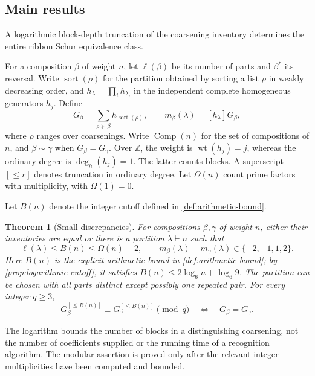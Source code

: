 \documentclass[11pt,a4paper]{amsart}
\numberwithin{equation}{section}
\theoremstyle{plain}
\newtheorem{theorem}{Theorem}[section]
\theoremstyle{definition}
\newcommand{\Z}{\mathbb Z}
\newcommand{\Comp}{\operatorname{Comp}}
\newcommand{\wt}{\operatorname{wt}}
\newcommand{\sort}{\operatorname{sort}}
\begin{document}
\subsection{Main results}

A logarithmic block-depth truncation of the coarsening inventory determines
the entire ribbon Schur equivalence class.

For a composition \(\beta\) of weight \(n\), let \(\ell(\beta)\) be
its number of parts and \(\beta^*\) its reversal.  Write \(\sort(\rho)\)
for the partition obtained by sorting a list \(\rho\) in weakly decreasing
order, and \(h_\lambda=\prod_i h_{\lambda_i}\) in the independent complete
homogeneous generators \(h_j\).  Define
\begin{equation}\label{eq:introG}
G_\beta=\sum_{\rho\succeq\beta}h_{\sort(\rho)},
\qquad m_\beta(\lambda)=[h_\lambda]G_\beta,
\end{equation}
where \(\rho\) ranges over coarsenings.  Write \(\Comp(n)\) for the set of
compositions of \(n\), and \(\beta\sim\gamma\) when \(G_\beta=G_\gamma\).
Over \(\Z\), the weight is \(\wt(h_j)=j\), whereas the ordinary degree is
\(\deg_h(h_j)=1\).
The latter counts blocks.  A superscript \([\le r]\) denotes truncation in
ordinary degree.  Let \(\Omega(n)\) count prime factors with multiplicity,
with \(\Omega(1)=0\).

Let \(B(n)\) denote the integer cutoff defined in
\cref{def:arithmetic-bound}.

\begin{theorem}[Small discrepancies]\label{thm:main-recognition}
For compositions \(\beta,\gamma\) of weight \(n\), either their inventories
are equal or there is a partition \(\lambda\vdash n\) such that
\[
\ell(\lambda)\le B(n)\le\Omega(n)+2,
\qquad m_\beta(\lambda)-m_\gamma(\lambda)\in\{-2,-1,1,2\}.
\]
Here \(B(n)\) is the explicit arithmetic bound in
\cref{def:arithmetic-bound}; by \cref{prop:logarithmic-cutoff}, it satisfies
\(B(n)\le2\log_6n+\log_6 9\).  The partition can be chosen with all parts
distinct except possibly one repeated pair.  For every integer \(q\ge3\),
\begin{equation}\label{eq:main-modular}
G_\beta^{[\le B(n)]}\equiv
G_\gamma^{[\le B(n)]}\pmod q
\quad\Longleftrightarrow\quad G_\beta=G_\gamma.
\end{equation}
\end{theorem}

The logarithm bounds the number of blocks in a distinguishing coarsening,
not the number of coefficients supplied or the running time of a recognition
algorithm.  The modular assertion is proved only after the relevant
integer multiplicities have been computed and bounded.
\end{document}
